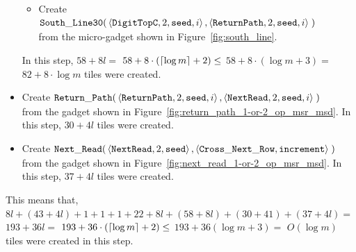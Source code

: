 \begin{itemize}
\begin{itemize}
        \item Create
        $\begin{aligned}[t]
            {\tt South\_Line30}(& \left\langle {\tt DigitTopC},  2, {\tt seed}, i \right\rangle,
                                  \left\langle {\tt ReturnPath}, 2, {\tt seed}, i \right\rangle \;)
        \end{aligned}$\\from the micro-gadget shown in Figure~\ref{fig:south_line}.
    \end{itemize}
    In this step, $ 58 + 8l =$
    $58 + 8 \cdot \left( \ceil*{\log m} + 2 \right) \leq$
    $58 + 8 \cdot \left( {\log m} + 3 \right) =$
    $82 + 8 \cdot {\log m}$ tiles were created.

    \item Create
    $\begin{aligned}[t]
        \returnpath(& \left\langle {\tt ReturnPath}, 2, {\tt seed}, i \right\rangle,
                      \left\langle {\tt NextRead},   2, {\tt seed}, i \right\rangle \;)
    \end{aligned}$\\from the gadget shown in Figure~\ref{fig:return_path_1-or-2_op_msr_msd}.
    In this step, $30 + 4l$ tiles were created.

    \item Create
    $\begin{aligned}[t]
        \nextread(& \left\langle {\tt NextRead}, 2,      {\tt seed}      \right\rangle,
                    \left\langle {\tt Cross\_Next\_Row}, {\tt increment} \right\rangle \;)
    \end{aligned}$\\from the gadget shown in Figure~\ref{fig:next_read_1-or-2_op_msr_msd}.
    In this step, $37 + 4l$ tiles were created.
\end{itemize}
%
This means that, $8l + (43 + 4l) + 1 + 1 + 1 + 22 + 8l + (58 + 8l) + (30 + 41) + (37 + 4l) =$
%
$193 + 36l =$
%
$193 + 36 \cdot \left( \ceil*{\log m} + 2 \right) \leq $
%
$193 + 36 \left( {\log m} + 3 \right) =$
%
$O \left( {\log m} \right) $ tiles were created in this step.
%


